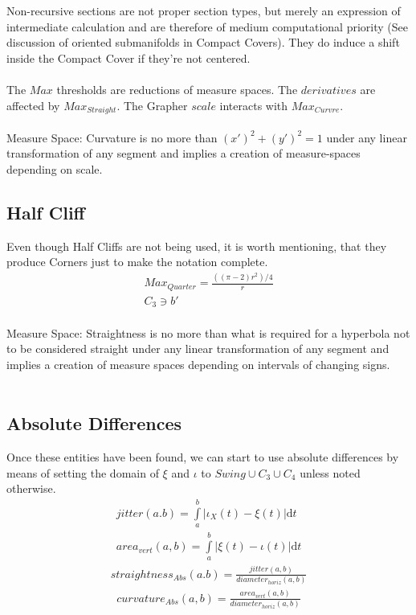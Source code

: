 \documentclass{report}
\begin{document}
Non-recursive sections are not proper section types, but merely an expression of intermediate calculation and are therefore of medium computational priority (See discussion of oriented submanifolds in Compact Covers). They do induce a shift inside the Compact Cover if they're not centered.\\\\
The $Max$ thresholds are reductions of measure spaces. The $derivatives$ are affected by $Max_{Straight}$. The Grapher $scale$ interacts with $Max_{Curvre}.$\\\\
Measure Space: Curvature is no more than $(x')^2 + (y')^2 =1$  under any linear transformation of any segment and implies a creation of measure-spaces depending on scale.
\subsection*{Half Cliff}
Even though Half Cliffs are not being used, it is worth mentioning, that they produce Corners just to make the notation complete.
\begin{align}
Max_{Quarter}=\frac{((\pi-2) r^2) /4}{r}\\
C_{3} \ni b'
\end{align}\\
Measure Space: Straightness is no more than what is required for a hyperbola not to be considered straight under any linear transformation of any segment and implies a creation of measure spaces depending on intervals of changing signs.\\\\

\subsection*{Absolute Differences}
Once these entities have been found, we can start to use absolute differences by means of setting the domain of $\xi$ and $\iota$ to $Swing \cup C_{3} \cup C_{4}$ unless noted otherwise.
\begin{align}
jitter(a.b)=\int \limits _{a}^{b}\lvert \iota_{X}(t) - \xi(t) \rvert \mathrm{d}t\\
area_{vert}(a,b)=\int \limits _{a}^{b} \lvert \xi(t)-\iota(t) \rvert \mathrm{d}t
\end{align}
\begin{align}
straightness_{Abs}(a.b)=\frac{jitter(a,b)}{diameter_{horiz}(a,b)}
\end{align}
\begin{align}
curvature_{Abs}(a,b) = \frac{area_{vert}(a,b)}{diameter_{horiz}(a,b)}
\end{align}
\end{document}
